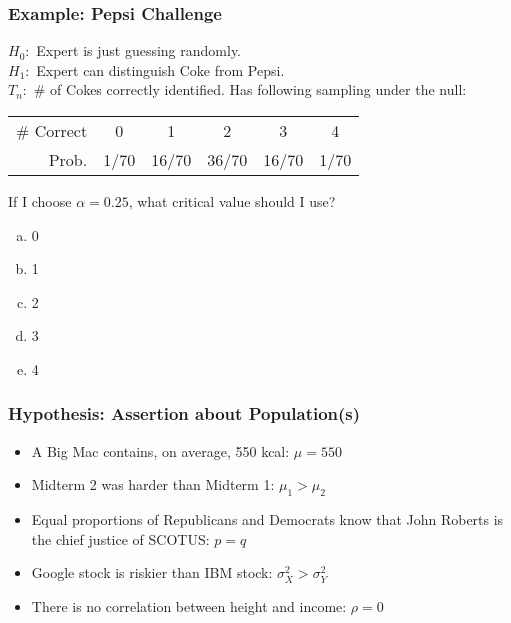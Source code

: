 \documentclass{beamer}
\begin{document}
\begin{frame}
\frametitle{Example: Pepsi Challenge }
\footnotesize 
$H_0\colon$ Expert is just guessing randomly.\\
$H_1\colon$ Expert can distinguish Coke from Pepsi.\\
$T_n\colon$ \# of Cokes correctly identified. Has following sampling under the null:
		\begin{center}
		\begin{tabular}{rccccc}
		\hline \footnotesize
		\# Correct & 0 & 1 & 2 & 3 & 4\\
		Prob.&1/70 & 16/70 & 36/70 & 16/70 &1/70\\
		\hline
		\end{tabular}
	\end{center}
	\vspace{2em}
	\normalsize
	\alert{If I choose $\alpha =0.25$, what critical value should I use?}
	\begin{enumerate}[(a)]
		\item 0
		\item 1
		\item 2
		\item 3
		\item 4
	\end{enumerate}
\end{frame}

\begin{frame}
\frametitle{Hypothesis: Assertion about Population(s)}
	\begin{itemize}
	\item A Big Mac contains, on average, 550 kcal: \alert{$\mu = 550$}
	\item Midterm 2 was harder than Midterm 1: \alert{$\mu_{1} >\mu_2$}
	\item Equal proportions of Republicans and Democrats know that John Roberts is the chief justice of SCOTUS: \alert{$p = q$}
	\item Google stock is riskier than IBM stock: \alert{$\sigma^2_{X} > \sigma^2_{Y}$}
	\item There is no correlation between height and income: \alert{$\rho = 0$} 
	\end{itemize}
\end{frame}
\end{document}

